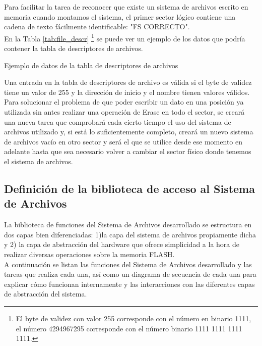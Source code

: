 Para facilitar la tarea de reconocer que existe un sistema de archivos escrito en memoria cuando montamos el sistema, el primer sector lógico contiene una cadena de texto fácilmente identificable: "FS CORRECTO".\\

En la Tabla \ref{tab:file_descr} \footnote {El byte de validez con valor 255 corresponde con el número en binario 1111, el número 4294967295 corresponde con el número binario 1111 1111 1111 1111.} se puede ver un ejemplo de los datos que podría contener la tabla de descriptores de archivos.\\

\begin{table}[h!]
\centering

\caption {Ejemplo de datos de la tabla de descriptores de archivos}
\label{tab:file_descr}
\end{table}

Una entrada en la tabla de descriptores de archivo es válida si el byte de validez tiene un valor de 255 y la dirección de inicio y el nombre tienen valores válidos.\\

Para solucionar el problema de que poder escribir un dato en una posición ya utilizada sin antes realizar una operación de Erase en todo el sector, se creará una nueva tarea que comprobará cada cierto tiempo el uso del sistema de archivos utilizado y, si está lo suficientemente completo, creará un nuevo sistema de archivos vacío en otro sector y será el que se utilice desde ese momento en adelante hasta que sea necesario volver a cambiar el sector físico donde tenemos el sistema de archivos.\\

\subsection{Definición de la biblioteca de acceso al Sistema de Archivos}

La biblioteca de funciones del Sistema de Archivos desarrollado se estructura en dos capas bien diferenciadas: 1)la capa del sistema de archivos propiamente dicha y 2) la capa de abstracción del hardware que ofrece simplicidad a la hora de realizar diversas operaciones sobre la memoria FLASH.\\

A continuación se listan las funciones del Sistema de Archivos desarrollado y las tareas que realiza cada una, así como un diagrama de secuencia de cada una para explicar cómo funcionan internamente y las interacciones con las diferentes capas de abstracción del sistema.\\


